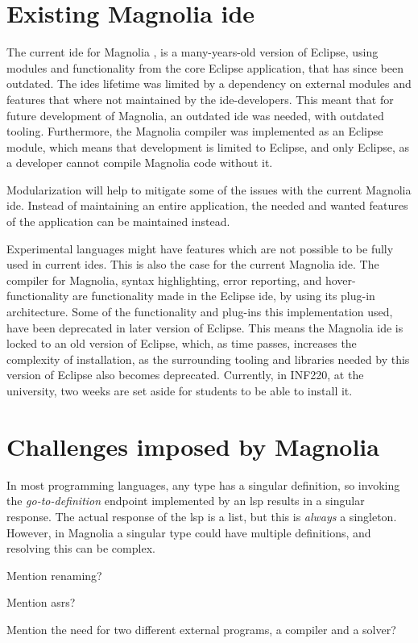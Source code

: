 \section{Existing Magnolia \gls{ide}}

The current \gls{ide} for Magnolia \cite{baggeIde}, is a many-years-old version
of Eclipse, using modules and functionality from the core Eclipse application,
that has since been outdated. The \gls{ide}s lifetime was limited by a
dependency on external modules and features that where not maintained by the
\gls{ide}-developers. This meant that for future development of Magnolia, an
outdated \gls{ide} was needed, with outdated tooling. Furthermore, the Magnolia
compiler was implemented as an Eclipse module, which means that development is
limited to Eclipse, and only Eclipse, as a developer cannot compile Magnolia
code without it.

Modularization will help to mitigate some of the issues with the current
Magnolia \gls{ide}. Instead of maintaining an entire application, the needed and
wanted features of the application can be maintained instead.

Experimental languages might have features which are not possible to be fully
used in current \gls{ide}s. This is also the case for the current Magnolia
\gls{ide}. The compiler for Magnolia, syntax highlighting, error reporting, and
hover-functionality are functionality made in the Eclipse \gls{ide}, by using
its plug-in architecture. Some of the functionality and plug-ins this
implementation used, have been deprecated in later version of Eclipse. This
means the Magnolia \gls{ide} is locked to an old version of Eclipse, which, as
time passes, increases the complexity of installation, as the surrounding
tooling and libraries needed by this version of Eclipse also becomes deprecated.
Currently, in INF220, at the university, two weeks are set aside for students to
be able to install it.

\section{Challenges imposed by Magnolia}

In most programming languages, any type has a singular definition, so invoking
the \textit{go-to-definition} endpoint implemented by an \gls{lsp} results in a
singular response. The actual response of the \gls{lsp} is a list, but this is
\textit{always} a singleton. However, in Magnolia a singular type could have
multiple definitions, and resolving this can be complex.

Mention renaming?

Mention \gls{asr}s?

Mention the need for two different external programs, a compiler and a solver?
